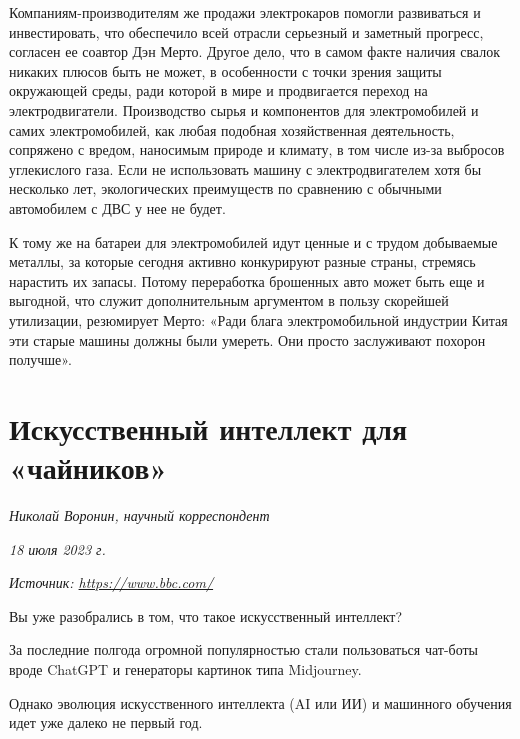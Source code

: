 Компаниям-производителям же продажи электрокаров помогли развиваться и инвестировать, что обеспечило всей отрасли серьезный и заметный прогресс, согласен ее соавтор Дэн Мерто. Другое дело, что в самом факте наличия свалок никаких плюсов быть не может, в особенности с точки зрения защиты окружающей среды, ради которой в мире и продвигается переход на электродвигатели. Производство сырья и компонентов для электромобилей и самих электромобилей, как любая подобная хозяйственная деятельность, сопряжено с вредом, наносимым природе и климату, в том числе из-за выбросов углекислого газа. Если не использовать машину с электродвигателем хотя бы несколько лет, экологических преимуществ по сравнению с обычными автомобилем с ДВС у нее не будет.

К тому же на батареи для электромобилей идут ценные и с трудом добываемые металлы, за которые сегодня активно конкурируют разные страны, стремясь нарастить их запасы. Потому переработка брошенных авто может быть еще и выгодной, что служит дополнительным аргументом в пользу скорейшей утилизации, резюмирует Мерто: «Ради блага электромобильной индустрии Китая эти старые машины должны были умереть. Они просто заслуживают похорон получше».


\newpage


\section{Искусственный интеллект для «чайников»}

\textit{Николай Воронин, научный корреспондент}

\textit{18 июля 2023 г.}

\textit{Источник: \url{https://www.bbc.com/}}




Вы уже разобрались в том, что такое искусственный интеллект?

За последние полгода огромной популярностью стали пользоваться чат-боты вроде ChatGPT и генераторы картинок типа Midjourney.

Однако эволюция искусственного интеллекта (AI или ИИ) и машинного обучения идет уже далеко не первый год.

